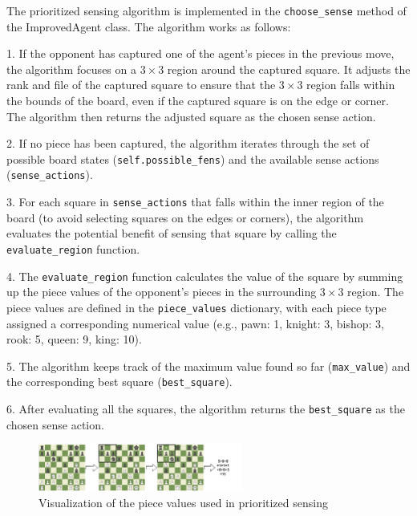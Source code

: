 \documentclass[10pt]{article}
\begin{document}
The prioritized sensing algorithm is implemented in the \texttt{choose\_sense} method of the ImprovedAgent class. The algorithm works as follows:

1. If the opponent has captured one of the agent's pieces in the previous move, the algorithm focuses on a $3\times3$ region around the captured square. It adjusts the rank and file of the captured square to ensure that the $3\times3$ region falls within the bounds of the board, even if the captured square is on the edge or corner. The algorithm then returns the adjusted square as the chosen sense action.
    
2. If no piece has been captured, the algorithm iterates through the set of possible board states (\texttt{self.possible\_fens}) and the available sense actions (\texttt{sense\_actions}).
    
3. For each square in \texttt{sense\_actions} that falls within the inner region of the board (to avoid selecting squares on the edges or corners), the algorithm evaluates the potential benefit of sensing that square by calling the \texttt{evaluate\_region} function.
    
4. The \texttt{evaluate\_region} function calculates the value of the square by summing up the piece values of the opponent's pieces in the surrounding $3\times3$ region. The piece values are defined in the \texttt{piece\_values} dictionary, with each piece type assigned a corresponding numerical value (e.g., pawn: 1, knight: 3, bishop: 3, rook: 5, queen: 9, king: 10).
    
5. The algorithm keeps track of the maximum value found so far (\texttt{max\_value}) and the corresponding best square (\texttt{best\_square}).
    
6. After evaluating all the squares, the algorithm returns the \texttt{best\_square} as the chosen sense action.

\begin{figure}[H]
  \centering
  \includegraphics[width=0.6\textwidth]{pieces.png}
  \caption{Visualization of the piece values used in prioritized sensing}
  \label{fig:pieces}
\end{figure}
\end{document}
